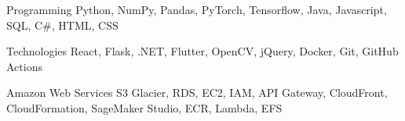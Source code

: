 
\begin{cvskills}
  \cvskill 
    {Programming}
    {Python, NumPy, Pandas, PyTorch, Tensorflow, Java, Javascript, SQL, C\#, HTML, CSS}

    \cvskill 
    {Technologies}
    {React, Flask, .NET, Flutter, OpenCV, jQuery, Docker, Git, GitHub Actions}

    \cvskill 
    {Amazon Web Services}
    {S3 Glacier, RDS, EC2, IAM, API Gateway, CloudFront, CloudFormation, SageMaker Studio, ECR, Lambda, EFS}
\end{cvskills}
